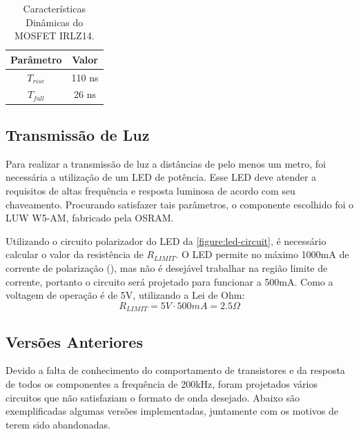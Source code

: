 	\begin{table}[h]
		\caption{Características Dinâmicas do MOSFET IRLZ14.}
		\centering
		\begin{tabular}{c c}
			\hline
			Parâmetro  & Valor  \\ \hline
			$T_{rise}$ & 110 ns \\
			$T_{fall}$ & 26 ns  \\ \hline
		\end{tabular}
		\label{table:irlz14-timing}
	\end{table}

	\subsection{Transmissão de Luz}

	Para realizar a transmissão de luz a distâncias de pelo menos um metro, foi necessária a utilização de um LED de potência. Esse LED deve atender a requisitos de altas frequência e resposta luminosa de acordo com seu chaveamento. Procurando satisfazer tais parâmetros, o componente escolhido foi o LUW W5-AM, fabricado pela OSRAM.

	Utilizando o circuito polarizador do LED da \autoref{figure:led-circuit}, é necessário calcular o valor da resistência de $R_{LIMIT}$. O LED permite no máximo 1000mA de corrente de polarização (\cite{datasheet-luw-w5am}), mas não é desejável trabalhar na região limite de corrente, portanto o circuito será projetado para funcionar a 500mA. Como a voltagem de operação é de 5V, utilizando a Lei de Ohm:
	\begin{equation}
	R_{LIMIT} = 5V \cdot 500mA = 2.5\Omega
	\end{equation}

	\subsection{Versões Anteriores}

	Devido a falta de conhecimento do comportamento de transistores e da resposta de todos os componentes a frequência de 200kHz, foram projetados vários circuitos que não satisfaziam o formato de onda desejado. Abaixo são exemplificadas algumas versões implementadas, juntamente com os motivos de terem sido abandonadas.

